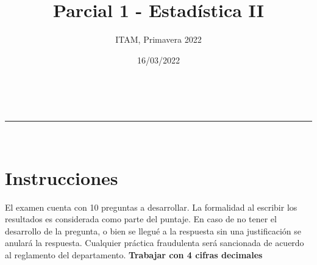 \documentclass[addpoints]{exam}
\makeatletter
\newcommand{\linia}{\rule{\linewidth}{0.5pt}}
\theoremstyle{mytheor}
\renewcommand{\maketitle}{
    \begin{center}
    \vspace{2ex}
    {\huge \textsc{\@title}}
    \vspace{1ex}
    \\
    \linia\\
    \@author \hfill \@date
    \vspace{4ex}
    \end{center}
  }
\makeatother
\begin{document}
  
  \title{Parcial 1 - Estadística II}
  
  \author{ITAM, Primavera 2022}
  
  \date{16/03/2022}
  
  \maketitle
  
  \section*{Instrucciones}
  
  El examen cuenta con 10 preguntas a desarrollar. La formalidad al escribir los resultados es considerada como parte del puntaje. En caso de no tener el desarrollo de la pregunta, o bien se llegué a la respuesta sin una justificación se anulará la respuesta. Cualquier práctica fraudulenta será sancionada de acuerdo al reglamento del departamento. \textbf{Trabajar con 4 cifras decimales}

\vspace{10pt}
\end{document}
